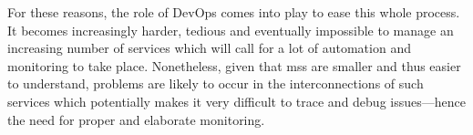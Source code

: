 
For these reasons, the role of DevOps comes into play to ease this whole process.
It becomes increasingly harder, tedious and eventually impossible to
manage an increasing number of services which will call for a lot of
automation and monitoring to take place. Nonetheless, given that \glspl{ms} are
smaller and thus easier to understand, problems are likely to occur in
the interconnections of such services which potentially makes it very
difficult to trace and debug issues---hence the need for proper and
elaborate monitoring.


